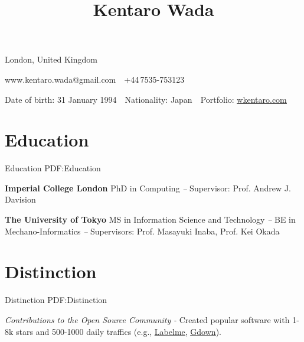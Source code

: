 \documentclass[letterpaper,MMMyyyy,nonstop]{simpleresumecv}
\newcommand{\CVAuthor}{Kentaro Wada}
\newcommand{\CVWebpage}{\href{https://wkentaro.com}{\underline{wkentaro.com}}}
\begin{document}

\title{\CVAuthor}

\begin{subtitle}
London, United Kingdom
\par
www.kentaro.wada@gmail.com
\,\SubBulletSymbol\,
+44\,7535-753123
\par
Date of birth: 31 January 1994
\,\SubBulletSymbol\,
Nationality: Japan
\,\SubBulletSymbol\,
Portfolio: \CVWebpage

\noindent\makebox[\linewidth]{\rule{0.8\paperwidth}{0.4pt}}
\end{subtitle}

\begin{body}


\section
{Education}
{Education}
{PDF:Education}

\textbf{Imperial College London}
\newline
PhD in Computing
\hfill
{\it {} -- }
\newline
Supervisor: Prof. Andrew J. Davision

\GapNoBreak

\textbf{The University of Tokyo}
\newline
MS in Information Science and Technology
\hfill
{\it {} -- }
\newline
BE in Mechano-Informatics
\hfill
{\it {} -- }
\newline
Supervisors: Prof. Masayuki Inaba, Prof. Kei Okada


\BigGapNoBreak

\section
{Distinction}
{Distinction}
{PDF:Distinction}

\textit{Contributions to the Open Source Community}
\hfill
{\it {} - }
\newline
Created popular software with 1-8k stars and 500-1000 daily traffics (e.g., \href{https://github.com/wkentaro/labelme}{\underline{Labelme}}, \href{https://github.com/wkentaro/gdown}{\underline{Gdown}}).


\end{body}
\end{document}
